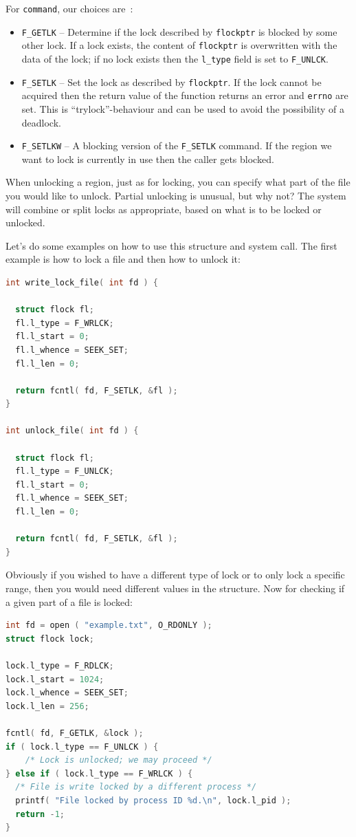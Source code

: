 For \texttt{command}, our choices are~\cite{apunix}:
\begin{itemize}
	\item \texttt{F\_GETLK} -- Determine if the lock described by \texttt{flockptr} is blocked by some other lock. If a lock exists, the content of \texttt{flockptr} is overwritten with the data of the lock; if no lock exists then the \texttt{l\_type} field is set to \texttt{F\_UNLCK}.
	\item \texttt{F\_SETLK} -- Set the lock as described by \texttt{flockptr}. If the lock cannot be acquired then the return value of the function returns an error and \texttt{errno} are set. This is ``trylock''-behaviour and can be used to avoid the possibility of a deadlock.
	\item \texttt{F\_SETLKW} -- A blocking version of the \texttt{F\_SETLK} command. If the region we want to lock is currently in use then the caller gets blocked.
\end{itemize}

When unlocking a region, just as for locking, you can specify what part of the file you would like to unlock. Partial unlocking is unusual, but why not? The system will combine or split locks as appropriate, based on what is to be locked or unlocked.

Let's do some examples on how to use this structure and system call. The first example is how to lock a file and then how to unlock it:

\begin{lstlisting}[language=C]
int write_lock_file( int fd ) {

  struct flock fl;
  fl.l_type = F_WRLCK;
  fl.l_start = 0;
  fl.l_whence = SEEK_SET;
  fl.l_len = 0;
  
  return fcntl( fd, F_SETLK, &fl );
}

int unlock_file( int fd ) {

  struct flock fl;
  fl.l_type = F_UNLCK;
  fl.l_start = 0;
  fl.l_whence = SEEK_SET;
  fl.l_len = 0;
  
  return fcntl( fd, F_SETLK, &fl );
}
\end{lstlisting}

Obviously if you wished to have a different type of lock or to only lock a specific range, then you would need different values in the structure. Now for checking if a given part of a file is locked:

\begin{lstlisting}[language=C]
int fd = open ( "example.txt", O_RDONLY );
struct flock lock;

lock.l_type = F_RDLCK;
lock.l_start = 1024;
lock.l_whence = SEEK_SET;
lock.l_len = 256;

fcntl( fd, F_GETLK, &lock );
if ( lock.l_type == F_UNLCK ) {
	/* Lock is unlocked; we may proceed */
} else if ( lock.l_type == F_WRLCK ) {
  /* File is write locked by a different process */
  printf( "File locked by process ID %d.\n", lock.l_pid );
  return -1;
}
\end{lstlisting}

